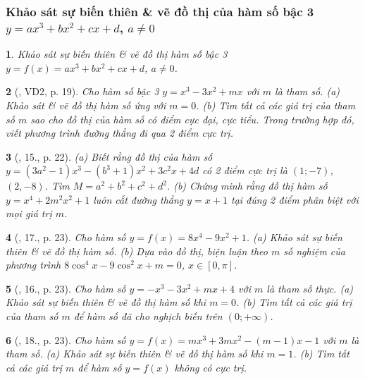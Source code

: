 \documentclass{article}
\newtheorem{baitoan}{}
\begin{document}
\subsubsection{Khảo sát sự biến thiên \& vẽ đồ thị của hàm số bậc 3 $y = ax^3 + bx^2 + cx + d$, $a\ne 0$}

\begin{baitoan}
	Khảo sát sự biến thiên \& vẽ đồ thị hàm số bậc 3 $y = f(x) = ax^3 + bx^2 + cx + d$, $a\ne 0$.
\end{baitoan}

\begin{baitoan}[\cite{TLCT_giai_tich_12}, VD2, p. 19]
	Cho hàm số bậc 3 $y = x^3 - 3x^2 + mx$ với $m$ là tham số. (a) Khảo sát \& vẽ đồ thị hàm số ứng với $m = 0$. (b) Tìm tất cả các giá trị của tham số $m$ sao cho đồ thị của hàm số có điểm cực đại, cực tiểu. Trong trường hợp đó, viết phương trình đường thẳng đi qua 2 điểm cực trị.
\end{baitoan}

\begin{baitoan}[\cite{TLCT_giai_tich_12}, 15., p. 22]
	(a) Biết rằng đồ thị của hàm số $y = (3a^2 - 1)x^3 - (b^3 + 1)x^2 + 3c^2x + 4d$ có 2 điểm cực trị là $(1;-7)$, $(2,-8)$. Tìm $M = a^2 + b^2 + c^2 + d^2$. (b) Chứng minh rằng đồ thị hàm số $y = x^4 + 2m^2x^2 + 1$ luôn cắt đường thẳng $y = x + 1$ tại đúng 2 điểm phân biệt với mọi giá trị $m$.
\end{baitoan}

\begin{baitoan}[\cite{TLCT_giai_tich_12}, 17., p. 23]
	Cho hàm số $y = f(x) = 8x^4 - 9x^2 + 1$. (a) Khảo sát sự biến thiên \& vẽ đồ thị hàm số. (b) Dựa vào đồ thị, biện luận theo $m$ số nghiệm của phương trình $8\cos^4x - 9\cos^2x + m = 0$, $x\in[0,\pi]$.
\end{baitoan}

\begin{baitoan}[\cite{TLCT_giai_tich_12}, 16., p. 23]
	Cho hàm số $y = -x^3 - 3x^2 + mx + 4$ với $m$ là tham số thực. (a) Khảo sát sự biến thiên \& vẽ đồ thị hàm số khi $m = 0$. (b) Tìm tất cả các giá trị của tham số $m$ để hàm số đã cho nghịch biến trên $(0;+\infty)$.
\end{baitoan}

\begin{baitoan}[\cite{TLCT_giai_tich_12}, 18., p. 23]
	Cho hàm số $y = f(x) = mx^3 + 3mx^2 - (m - 1)x - 1$ với $m$ là tham số. (a) Khảo sát sự biến thiên \& vẽ đồ thị hàm số khi $m = 1$. (b) Tìm tất cả các giá trị $m$ để hàm số $y = f(x)$ không có cực trị.	
\end{baitoan}
\end{document}
